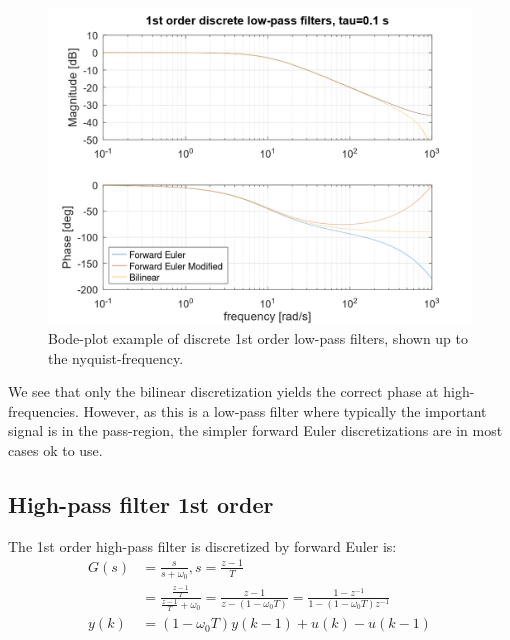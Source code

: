 \documentclass[]{book}
\begin{document}
\begin{figure}
\includegraphics[width=1\linewidth]{images/filters/lpf_1st_disc} \caption{Bode-plot example of discrete 1st order low-pass filters, shown up to the nyquist-frequency.}\label{fig:unnamed-chunk-8}
\end{figure}

We see that only the bilinear discretization yields the correct phase at high-frequencies. However, as this is a low-pass filter where typically the important signal is in the pass-region, the simpler forward Euler discretizations are in most cases ok to use.

\hypertarget{high-pass-filter-1st-order-1}{%
\subsection{High-pass filter 1st order}\label{high-pass-filter-1st-order-1}}

The 1st order high-pass filter is discretized by forward Euler is:
\[
\begin{aligned}
G(s) &=  \frac{s}{s + \omega_0}, s=\frac{z-1}{T}  \\
&=  \frac{\frac{z-1}{T}}{\frac{z-1}{T} + \omega_0} =\frac{z-1}{z-(1- \omega_0 T)} 
=\frac{1-z^{-1}}{1-(1- \omega_0 T)z^{-1}}  \\
y(k) &=   (1 - \omega_0 T)y(k-1)   +  u(k)-u(k-1) \\
\end{aligned}
\label{eq:dhpf1}
\]
\end{document}

